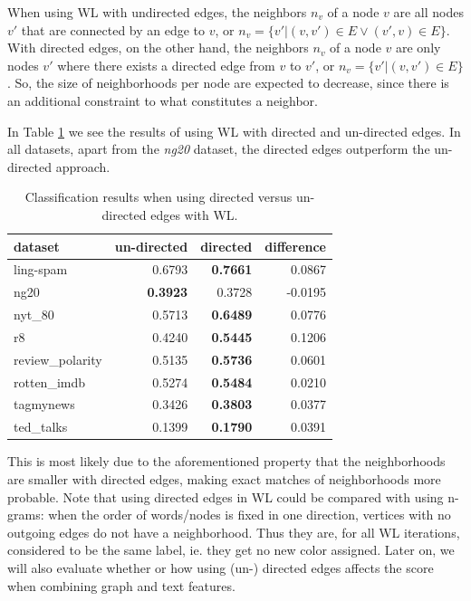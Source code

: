 When using WL with undirected edges, the neighbors $n_v$ of a node $v$ are all nodes $v'$ that are connected by an edge to $v$, or $n_v = \{v' | (v, v') \in E \lor (v', v ) \in E \}$.
With directed edges, on the other hand, the neighbors $n_v$ of a node $v$ are only nodes $v'$ where there exists a directed edge from $v$ to $v'$, or $n_v = \{v' | (v, v') \in E \}$.
So, the size of neighborhoods per node are expected to decrease, since there is an additional constraint to what constitutes a neighbor.

In Table \ref{table:results_directed_vs_undirected} we see the results of using WL with directed and un-directed edges.
In all datasets, apart from the \textit{ng20} dataset, the directed edges outperform the un-directed approach.

\begin{table}[htb!]
	\centering
\begin{tabular}{lrrr}
	dataset &  un-directed & directed &  difference \\
	\midrule
	ling-spam       &  0.6793 &  \textbf{0.7661} &  0.0867 \\
	ng20            &  \textbf{0.3923} &  0.3728 & -0.0195 \\
	nyt\_80          &  0.5713 &  \textbf{0.6489} &  0.0776 \\
	r8              &  0.4240 &  \textbf{0.5445} &  0.1206 \\
	review\_polarity &  0.5135 & \textbf{ 0.5736 }&  0.0601 \\
	rotten\_imdb     &  0.5274 &  \textbf{0.5484} &  0.0210 \\
	tagmynews       &  0.3426 &  \textbf{0.3803} &  0.0377 \\
	ted\_talks       &  0.1399 &  \textbf{0.1790} &  0.0391 \\
	\bottomrule
\end{tabular}
\caption[Results: WL with directed and un-directed edges]{Classification results when using directed versus un-directed edges with WL.}\label{table:results_directed_vs_undirected}
\end{table}

This is most likely due to the aforementioned property that the neighborhoods are smaller with directed edges, making exact matches of neighborhoods more probable.
Note that using directed edges in WL could be compared with using n-grams: when the order of words/nodes is fixed in one direction, vertices with no outgoing edges do not have a neighborhood. Thus they are, for all WL iterations, considered to be the same label, ie. they get no new color assigned.
Later on, we will also evaluate whether or how using (un-) directed edges affects the score when combining graph and text features.

